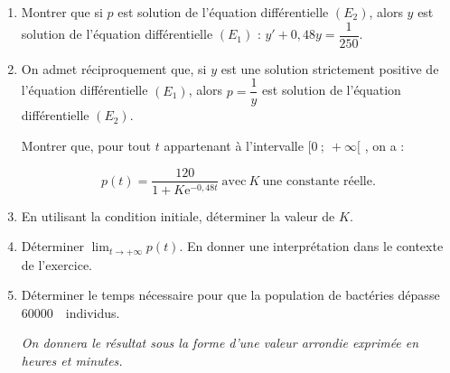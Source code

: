 \documentclass[10pt]{article}
\providecommand{\e}{{\mathrm{e}}}
\providecommand{\np}[2][]{{#2~#1}}
\begin{document}
\begin{enumerate}
\item Montrer que si $p$ est solution de l'équation différentielle $(E_2)$, alors $y$ est solution de l'équation différentielle $(E_1)$ : \quad $y' + 0,48y = \dfrac{1}{250}$.
\item On admet réciproquement que, si $y$ est une solution strictement positive de l'équation différentielle $(E_1)$, alors $p = \dfrac 1y$ est solution de l'équation différentielle $(E_2)$.

Montrer que, pour tout $t$ appartenant à l'intervalle $[0~;~ +\infty[$ , on a :

\[p(t) = \dfrac{120}{1 + K\e^{-0,48t}}~ \text{avec}\: K\: \text{une constante réelle}.\] 
\item En utilisant la condition initiale, déterminer la valeur de $K$.
\item Déterminer $\displaystyle\lim_{t \to + \infty} p(t)$. En donner une interprétation dans le contexte de l'exercice.
\item Déterminer le temps nécessaire pour que la population de bactéries dépasse \np{60000}~individus.

\emph{On donnera le résultat sous la forme d'une valeur arrondie exprimée en heures et minutes.}
\end{enumerate}
\end{document}
